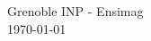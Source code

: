 \documentclass[12pt]{report}
\begin{document}
\begin{titlepage}

{\Large Grenoble INP - Ensimag}\\[0.8cm]
{\large \today}\\[3cm] %


 

\vfill %

\end{titlepage}


\tableofcontents
\newpage

\sectionfont{\scshape}



\end{document}
